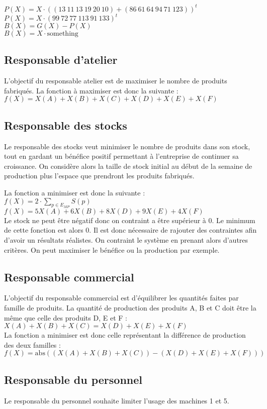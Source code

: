 \documentclass[a4paper, 11pt]{article}
\begin{document}
$P(X) = X\cdot\left((13~11~13~19~20~10) + (86~61~64~94~71~123)\right)^t$ \\
$P(X) = X\cdot(99~72~77~113~91~133)^t$ \\

$B(X) = G(X) - P(X)$ \\
$B(X) = X\cdot\mbox{something}$ \\

\subsection{Responsable d'atelier}
L'objectif du responsable atelier est de maximiser le nombre de produits fabriqués.
La fonction à maximiser est donc la suivante : \\
$ f(X) = X(A) + X(B) + X(C) + X(D) + X(E) + X(F) $

\subsection{Responsable des stocks}
Le responsable des stocks veut minimiser le nombre de produits dans son stock,
tout en gardant un bénéfice positif permettant à l'entreprise de continuer sa croissance.
On considère alors la taille de stock initial au début de la semaine de production
plus l'espace que prendront les produits fabriqués.

La fonction a minimiser est donc la suivante : \\
$f(X) = 2\cdot \sum_{p\in E_{MP}} S(p)$ \\
$f(X) = 5 X(A) + 6 X(B) + 8 X(D) + 9 X(E) + 4 X(F)$ \\

Le stock ne peut être négatif donc on contraint a être supérieur à 0.
Le minimum de cette fonction est alors 0. Il est donc nécessaire de rajouter
des contraintes afin d'avoir un résultats réalistes.
On contraint le système en prenant alors d'autres critères.
On peut maximiser le bénéfice ou la production par exemple.

\subsection{Responsable commercial}
L'objectif du responsable commercial est d'équilibrer les quantités faites par famille de produits.
La quantité de production des produits A, B et C doit être la même que celle des produits D, E et F : \\
$X(A) + X(B) + X(C) = X(D) + X(E) + X(F)$ \\

La fonction a minimiser est donc celle représentant la différence de production des deux familles : \\
$f(X) = \mbox{abs}((X(A) + X(B) + X(C)) - (X(D) + X(E) + X(F))) $

\subsection{Responsable du personnel}
Le responsable du personnel souhaite limiter l'usage des machines 1 et 5.
\end{document}

